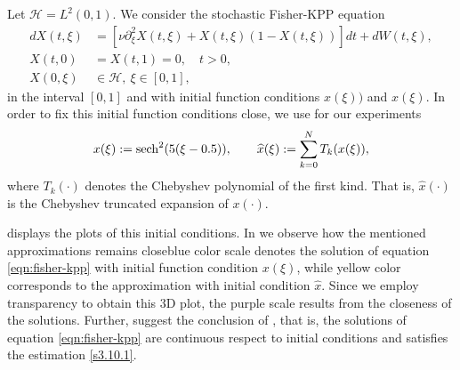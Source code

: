 Let $\mathcal{H} = L^2 (0,1)$. We consider the stochastic Fisher-KPP 
    equation 
    \begin{equation}
        \label{eqn:fisher-kpp}
        \begin{aligned}
            d X(t, \xi) &= 
                \left[
                    \nu 
                    \partial_{\xi} ^ 2 X(t, \xi)
                    +
                    X(t, \xi) (1 -X(t, \xi) )
                \right]
                dt
                +
                dW(t, \xi),
            \\
            X(t, 0) &= X(t, 1) =0, \quad t>0, 
            \\
            X(0, \xi) & \in 
            \mathcal{H}, \ \xi \in [0, 1],
        \end{aligned}
    \end{equation}
    in the interval $[0, 1]$ and with initial function conditions
    $x(\xi))$ and  $\widehat{x}(\xi)$. In order to fix this initial function 
    conditions  close, we use for our experiments
    \begin{equation}
        x(\xi) := \operatorname{sech} ^ 2( 5  (\xi - 0.5)),
        \qquad
        \widehat{x}(\xi) :=
            \sum_{k=0} ^ N
             T_k(x(\xi)),
    \end{equation}
    where $T_k(\cdot)$ denotes the Chebyshev polynomial of the first kind. That 
    is, $\widehat{x}(\cdot)$ is the Chebyshev truncated expansion of $x(\cdot)$.
    
     displays the 
    plots of this initial conditions. In  we 
    observe how the mentioned approximations remains close\textemdash blue
    color scale denotes the solution of equation \ref{eqn:fisher-kpp}
    with initial function condition $x(\xi)$, while yellow color corresponds 
    to the approximation with initial condition $\widehat{x}$. Since we employ
    transparency to obtain this 3D plot, the  purple scale results from the 
    closeness of the solutions. Further,   suggest the 
    conclusion of , that is, the solutions of equation
    \eqref{eqn:fisher-kpp} are continuous respect to initial conditions and 
    satisfies the estimation \eqref{s3.10.1}.

